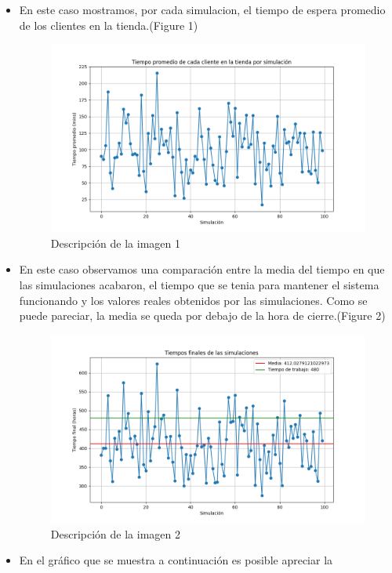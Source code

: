 \documentclass[
]{article}
\begin{document}
\begin{itemize}
\item
  En este caso mostramos, por cada simulacion, el tiempo de espera
  promedio de los clientes en la tienda.(Figure 1)
\begin{figure}[!htbp] \centering \includegraphics{mi_grafica.png} \caption{Descripción de la imagen 1} \label{fig:mi_grafica} \end{figure}
\item
  En este caso observamos una comparación entre la media del tiempo en
  que las simulaciones acabaron, el tiempo que se tenia para mantener el
  sistema funcionando y los valores reales obtenidos por las
  simulaciones. Como se puede pareciar, la media se queda por debajo de
  la hora de cierre.(Figure 2)
\begin{figure}[!htbp] \centering \includegraphics{mi_grafica2.png} \caption{Descripción de la imagen 2} \label{fig:mi_grafica2} \end{figure}
\item
  En el gráfico que se muestra a continuación es posible apreciar la

\end{itemize}
\end{document}
